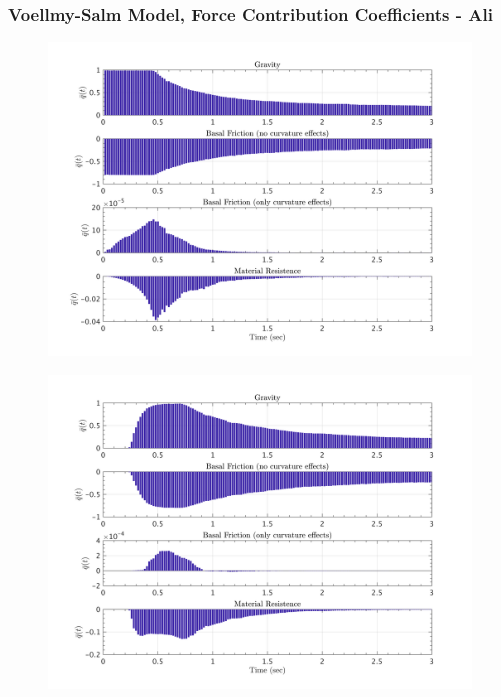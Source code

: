 \documentclass{article}
\begin{document}
\subsubsection{Voellmy-Salm Model, Force Contribution Coefficients - Ali}
\begin{figure}[H]
        \begin{minipage}[b]{0.5\linewidth}
                \centering
                \includegraphics[width=1\textwidth]{InclinedPlane/LocalRecords/ContribF1_V_x.png}
                \label{fig:Ramp-Vx1}
        \end{minipage}
        \begin{minipage}[b]{0.5\linewidth}
                \centering
                \includegraphics[width=1\textwidth]{InclinedPlane/LocalRecords/ContribF8_V_x.png}
                \label{fig:Ramp-Vx2}
        \end{minipage}


\end{figure}
\end{document}
